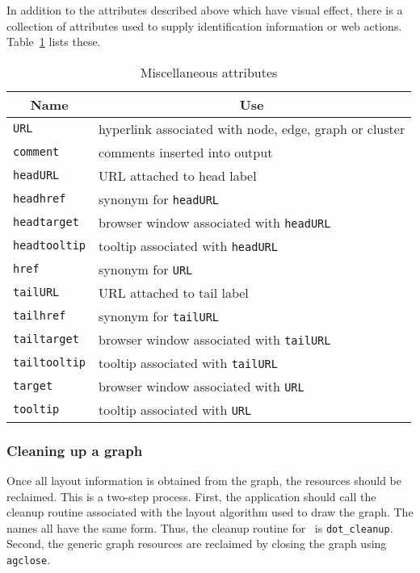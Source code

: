 In addition to the attributes described above which have visual effect,
there is a collection of attributes used to supply identification
information or web actions. Table~\ref{tab:web} lists these.
\begin{table}[htbp]\footnotesize
\centering
\begin{tabular}[t]{|l|p{3.5in}|} \hline
\multicolumn{1}{|c|}{Name} & \multicolumn{1}{c|}{Use} \\ \hline
{\tt URL} & hyperlink associated with node, edge, graph or cluster \\
{\tt comment} & comments inserted into output \\
{\tt headURL} & URL attached to head label \\
{\tt headhref} & synonym for {\tt headURL} \\
{\tt headtarget} & browser window associated with {\tt headURL} \\
{\tt headtooltip} & tooltip associated with {\tt headURL} \\
{\tt href} & synonym for {\tt URL} \\
{\tt tailURL} & URL attached to tail label \\
{\tt tailhref} & synonym for {\tt tailURL} \\
{\tt tailtarget} & browser window associated with {\tt tailURL} \\
{\tt tailtooltip} & tooltip associated with {\tt tailURL} \\
{\tt target} & browser window associated with {\tt URL} \\
{\tt tooltip} & tooltip associated with {\tt URL} \\
\hline
\end{tabular}
\caption{Miscellaneous attributes}
\label{tab:web}
\end{table}

\subsubsection{Cleaning up a graph}
\label{sec:clean}

Once all layout information is obtained from the graph, the resources
should be reclaimed.
This is a two-step process. First, the application should call
the cleanup routine associated with the layout algorithm used to
draw the graph. The names all have the same form. Thus, the cleanup
routine for \dot\ is \verb+dot_cleanup+. Second, the generic graph
resources are reclaimed by closing the graph using {\tt agclose}.

